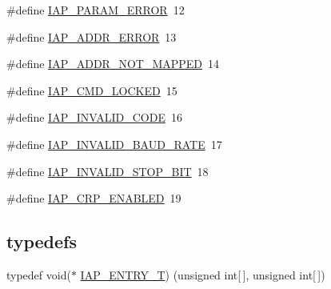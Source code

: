 \begin{DoxyCompactItemize}
\item 
\#define \hyperlink{group___c_o_m_m_o_n___i_a_p_ga6bf1bec9cbb419f8006447171e9750b7}{I\+A\+P\+\_\+\+P\+A\+R\+A\+M\+\_\+\+E\+R\+R\+OR}~12
\item 
\#define \hyperlink{group___c_o_m_m_o_n___i_a_p_gaaff51c256373e4a20f8dab1adc1300f3}{I\+A\+P\+\_\+\+A\+D\+D\+R\+\_\+\+E\+R\+R\+OR}~13
\item 
\#define \hyperlink{group___c_o_m_m_o_n___i_a_p_ga4cfd7e0c133c450664f0a60bfbbd9eaa}{I\+A\+P\+\_\+\+A\+D\+D\+R\+\_\+\+N\+O\+T\+\_\+\+M\+A\+P\+P\+ED}~14
\item 
\#define \hyperlink{group___c_o_m_m_o_n___i_a_p_gafdceac1acd5c460094011136c08574a4}{I\+A\+P\+\_\+\+C\+M\+D\+\_\+\+L\+O\+C\+K\+ED}~15
\item 
\#define \hyperlink{group___c_o_m_m_o_n___i_a_p_ga456a8363a47d21d7198056da4b1e9f61}{I\+A\+P\+\_\+\+I\+N\+V\+A\+L\+I\+D\+\_\+\+C\+O\+DE}~16
\item 
\#define \hyperlink{group___c_o_m_m_o_n___i_a_p_ga6913ca0660dc1a2cccd8c6b09bcdbc75}{I\+A\+P\+\_\+\+I\+N\+V\+A\+L\+I\+D\+\_\+\+B\+A\+U\+D\+\_\+\+R\+A\+TE}~17
\item 
\#define \hyperlink{group___c_o_m_m_o_n___i_a_p_ga6c61111082b04ba6780151c83f8c3644}{I\+A\+P\+\_\+\+I\+N\+V\+A\+L\+I\+D\+\_\+\+S\+T\+O\+P\+\_\+\+B\+IT}~18
\item 
\#define \hyperlink{group___c_o_m_m_o_n___i_a_p_gaaccc191ce402e19b0c0ae399f614efe8}{I\+A\+P\+\_\+\+C\+R\+P\+\_\+\+E\+N\+A\+B\+L\+ED}~19
\end{DoxyCompactItemize}
\subsection*{\textquotesingle{}typedefs\textquotesingle{}}
\begin{DoxyCompactItemize}
\item 
typedef void($\ast$ \hyperlink{group___c_o_m_m_o_n___i_a_p_gacbe9c7d2b4580da682f004b2c043f221}{I\+A\+P\+\_\+\+E\+N\+T\+R\+Y\+\_\+T}) (unsigned int\mbox{[}$\,$\mbox{]}, unsigned int\mbox{[}$\,$\mbox{]})
\end{DoxyCompactItemize}
